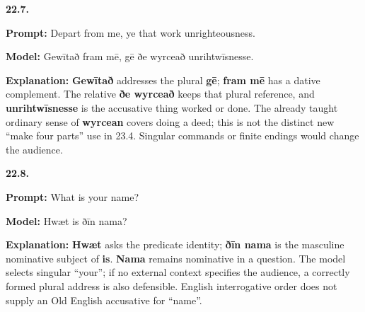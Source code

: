 \par\begin{minipage}{\linewidth}\raggedright
\textbf{22.7.}

\textbf{Prompt:} Depart from me, ye that work unrighteousness.

\textbf{Model:} Gewītað fram mē, gē ðe wyrceað unrihtwīsnesse.

\textbf{Explanation:} \textbf{Gewītað} addresses the plural \textbf{gē}; \textbf{fram mē} has a dative complement. The relative \textbf{ðe wyrceað} keeps that plural reference, and \textbf{unrihtwīsnesse} is the accusative thing worked or done. The already taught ordinary sense of \textbf{wyrcean} covers doing a deed; this is not the distinct new “make four parts” use in 23.4. Singular commands or finite endings would change the audience.

\end{minipage}\par\addvspace{4pt}

\par\begin{minipage}{\linewidth}\raggedright
\textbf{22.8.}

\textbf{Prompt:} What is your name?

\textbf{Model:} Hwæt is ðīn nama?

\textbf{Explanation:} \textbf{Hwæt} asks the predicate identity; \textbf{ðīn nama} is the masculine nominative subject of \textbf{is}. \textbf{Nama} remains nominative in a question. The model selects singular “your”; if no external context specifies the audience, a correctly formed plural address is also defensible. English interrogative order does not supply an Old English accusative for “name”.

\end{minipage}\par\addvspace{4pt}

